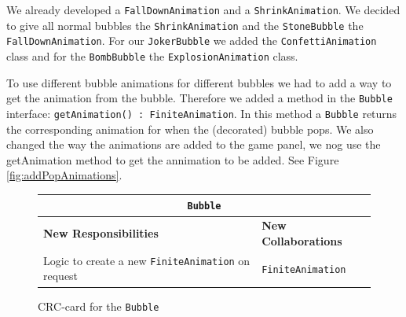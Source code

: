 \documentclass[a4paper]{article}
\begin{document}
We already developed a \texttt{FallDownAnimation} and a \texttt{ShrinkAnimation}. We decided to give all normal bubbles the \texttt{ShrinkAnimation} and the \texttt{StoneBubble} the \texttt{FallDownAnimation}. For our \texttt{JokerBubble} we added the \texttt{ConfettiAnimation} class and for the \texttt{BombBubble} the \texttt{ExplosionAnimation} class.

To use different bubble animations for different bubbles we had to add a way to get the animation from the bubble. Therefore we added a method in the \texttt{Bubble} interface: \texttt{getAnimation() : FiniteAnimation}. In this method a \texttt{Bubble} returns the corresponding animation for when the (decorated) bubble pops. We also changed the way the animations are added to the game panel, we nog use the getAnimation method to get the annimation to be added. See Figure \ref{fig:addPopAnimations}.

\begin{figure}[H]
	\centering
	\begin{tabular}{ | p{8cm} | p{4cm} | }
      \multicolumn{2}{c}{\texttt{Bubble}} \\ \hline
      \textbf{New Responsibilities} & \textbf{New Collaborations} \\ \hline
      Logic to create a new  \texttt{FiniteAnimation} on request & \texttt{FiniteAnimation} \\
      \hline
    \end{tabular}
    \caption{CRC-card for the \texttt{Bubble}}
\end{figure}

%
%
\end{document}

